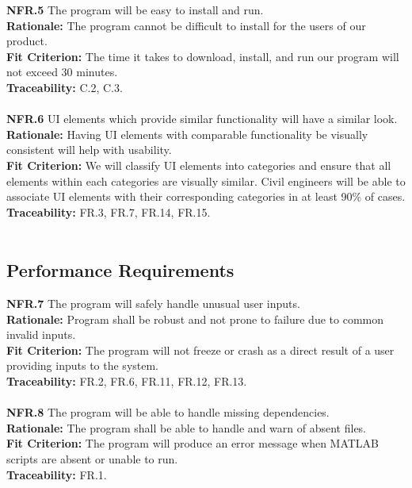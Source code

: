 \documentclass[12pt]{article}
\begin{document}
  \noindent\textbf{NFR.5} The program will be easy to install and run.\\
  \textbf{Rationale:} The program cannot be difficult to install for the users of our product.\\
  \textbf{Fit Criterion:} The time it takes to download, install, and run our program will not exceed 30 minutes.\\
  \textbf{Traceability:} C.2, C.3.\\\\

  \noindent\textbf{NFR.6} UI elements which provide similar functionality will have a similar look.\\
  \textbf{Rationale:} Having UI elements with comparable functionality be visually consistent will help with usability.\\
  \textbf{Fit Criterion:} We will classify UI elements into categories and ensure that all elements within each categories are visually similar. 
  Civil engineers will be able to associate UI elements with their corresponding categories in at least 90\% of cases.\\
  \textbf{Traceability:} FR.3, FR.7, FR.14, FR.15.\\\\

\subsection{Performance Requirements}

  \textbf{NFR.7} The program will safely handle unusual user inputs.\\
  \textbf{Rationale:} Program shall be robust and not prone to failure due to common invalid inputs.\\
  \textbf{Fit Criterion:} The program will not freeze or crash as a direct result of a user providing inputs to the system.\\
  \textbf{Traceability:} FR.2, FR.6, FR.11, FR.12, FR.13.\\\\

  \noindent\textbf{NFR.8} The program will be able to handle missing dependencies.\\
  \textbf{Rationale:} The program shall be able to handle and warn of absent files.\\
  \textbf{Fit Criterion:} The program will produce an error message when MATLAB scripts are absent or unable to run.\\
  \textbf{Traceability:} FR.1.\\\\
\end{document}
